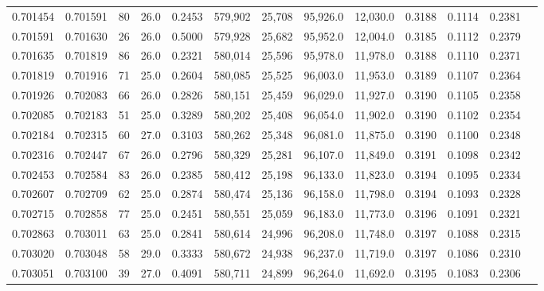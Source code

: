 \begin{tabular}{rrrrrrrrrrrrr}
0.701454 & 0.701591 &    80 & 26.0 &                                     0.2453 & 579,902 &  25,708 &  95,926.0 &  12,030.0 & 0.3188 & 0.1114 & 0.2381 \\
0.701591 & 0.701630 &    26 & 26.0 &                                     0.5000 & 579,928 &  25,682 &  95,952.0 &  12,004.0 & 0.3185 & 0.1112 & 0.2379 \\
0.701635 & 0.701819 &    86 & 26.0 &                                     0.2321 & 580,014 &  25,596 &  95,978.0 &  11,978.0 & 0.3188 & 0.1110 & 0.2371 \\
0.701819 & 0.701916 &    71 & 25.0 &                                     0.2604 & 580,085 &  25,525 &  96,003.0 &  11,953.0 & 0.3189 & 0.1107 & 0.2364 \\
0.701926 & 0.702083 &    66 & 26.0 &                                     0.2826 & 580,151 &  25,459 &  96,029.0 &  11,927.0 & 0.3190 & 0.1105 & 0.2358 \\
0.702085 & 0.702183 &    51 & 25.0 &                                     0.3289 & 580,202 &  25,408 &  96,054.0 &  11,902.0 & 0.3190 & 0.1102 & 0.2354 \\
0.702184 & 0.702315 &    60 & 27.0 &                                     0.3103 & 580,262 &  25,348 &  96,081.0 &  11,875.0 & 0.3190 & 0.1100 & 0.2348 \\
0.702316 & 0.702447 &    67 & 26.0 &                                     0.2796 & 580,329 &  25,281 &  96,107.0 &  11,849.0 & 0.3191 & 0.1098 & 0.2342 \\
0.702453 & 0.702584 &    83 & 26.0 &                                     0.2385 & 580,412 &  25,198 &  96,133.0 &  11,823.0 & 0.3194 & 0.1095 & 0.2334 \\
0.702607 & 0.702709 &    62 & 25.0 &                                     0.2874 & 580,474 &  25,136 &  96,158.0 &  11,798.0 & 0.3194 & 0.1093 & 0.2328 \\
0.702715 & 0.702858 &    77 & 25.0 &                                     0.2451 & 580,551 &  25,059 &  96,183.0 &  11,773.0 & 0.3196 & 0.1091 & 0.2321 \\
0.702863 & 0.703011 &    63 & 25.0 &                                     0.2841 & 580,614 &  24,996 &  96,208.0 &  11,748.0 & 0.3197 & 0.1088 & 0.2315 \\
0.703020 & 0.703048 &    58 & 29.0 &                                     0.3333 & 580,672 &  24,938 &  96,237.0 &  11,719.0 & 0.3197 & 0.1086 & 0.2310 \\
0.703051 & 0.703100 &    39 & 27.0 &                                     0.4091 & 580,711 &  24,899 &  96,264.0 &  11,692.0 & 0.3195 & 0.1083 & 0.2306 \\

\end{tabular}

